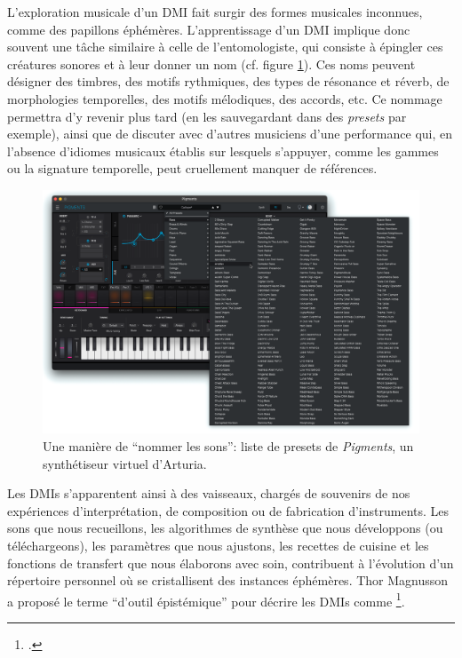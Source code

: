 \noindent L'exploration musicale d'un \gls{DMI} fait surgir des formes musicales inconnues, comme des papillons éphémères. L'apprentissage d'un \gls{DMI} implique donc souvent une tâche similaire à celle de l'entomologiste, qui consiste à épingler ces créatures sonores et à leur donner un nom (cf. figure \ref{fig:ephemeral:entomologie}). Ces noms peuvent désigner des timbres, des motifs rythmiques, des types de résonance et réverb, de morphologies temporelles, des motifs mélodiques, des accords, etc. Ce nommage permettra d'y revenir plus tard (en les sauvegardant dans des \textit{presets} par exemple), ainsi que de discuter avec d'autres musiciens d'une performance qui, en l'absence d'idiomes musicaux établis sur lesquels s'appuyer, comme les gammes ou la signature temporelle, peut cruellement manquer de références. %
\begin{figure}[!htbp]
	\captionsetup{format=plain}%
	\includegraphics[width=\textwidth]{gfx/02_ephemeral/Pigments_presets.png}
	\caption[Entomologie musicale]{Une manière de ``nommer les sons'': liste de presets de \textit{Pigments}, un synthétiseur virtuel d'Arturia.}
	\label{fig:ephemeral:entomologie}
\end{figure}
\indent Les \glspl{DMI} s'apparentent ainsi à des vaisseaux, chargés de souvenirs de nos expériences d'interprétation, de composition ou de fabrication d'instruments. Les sons que nous recueillons, les algorithmes de synthèse que nous développons (ou téléchargeons), les paramètres que nous ajustons, les recettes de cuisine et les fonctions de transfert que nous élaborons avec soin, contribuent à l'évolution d'un répertoire personnel où se cristallisent des instances éphémères. Thor Magnusson a proposé le terme ``d'outil épistémique'' pour décrire les \glspl{DMI} comme \footnote{\cite{magnusson_epistemic_2009}.}.\\

